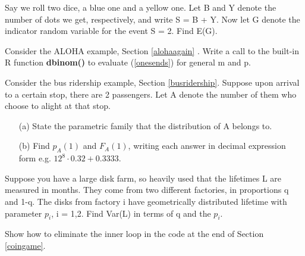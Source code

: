 \oneproblem
Say we roll two dice, a blue one and a yellow one.  Let B
and Y denote the number of dots we get, respectively, and write S = B +
Y.  Now let G denote the indicator random variable for the event S = 2.  
Find E(G).


\oneproblem Consider the ALOHA example, Section \ref{alohaagain} .
Write a call to the built-in R function {\bf dbinom()} to evaluate
(\ref{onesends}) for general m and p.

\oneproblem Consider the bus ridership example, Section
\ref{busridership}.  Suppose upon arrival to a certain stop, there are 2
passengers.  Let A denote the number of them who choose to alight at
that stop.

\begin{itemize}

\item [(a)] State the parametric family that the distribution of A
belongs to.

\item [(b)] Find $p_A(1)$ and $F_A(1)$, writing each answer in
decimal expression form e.g. $12^8 \cdot 0.32 + 0.3333$.

\end{itemize}

\oneproblem
Suppose you have a large disk farm, so heavily used that the lifetimes L
are measured in months. They come from two different factories, in
proportions q and 1-q. The disks from factory i have geometrically
distributed lifetime with parameter $p_i$, i = 1,2. Find Var(L) in terms of
q and the $p_i$. 

\oneproblem
Show how to eliminate the inner loop in the code at the end of Section
\ref{coingame}.

